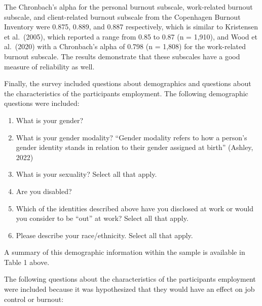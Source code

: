 \documentclass[
  twocolumn]{article}
\providecommand{\tightlist}{%
  \setlength{\itemsep}{0pt}\setlength{\parskip}{0pt}}\usepackage{longtable,booktabs,array}
\begin{document}
The Chronbach's alpha for the personal burnout subscale, work-related
burnout subscale, and client-related burnout subscale from the
Copenhagen Burnout Inventory were 0.875, 0.889, and 0.887 respectively,
which is similar to Kristensen et al.~(2005), which reported a range
from 0.85 to 0.87 (n = 1,910), and Wood et al.~(2020) with a Chronbach's
alpha of 0.798 (n = 1,808) for the work-related burnout subscale. The
results demonstrate that these subscales have a good measure of
reliability as well.

Finally, the survey included questions about demographics and questions
about the characteristics of the participants employment. The following
demographic questions were included:

\begin{enumerate}
\def\labelenumi{\arabic{enumi}.}
\tightlist
\item
  What is your gender?
\item
  What is your gender modality? ``Gender modality refers to how a
  person's gender identity stands in relation to their gender assigned
  at birth'' (Ashley, 2022)
\item
  What is your sexuality? Select all that apply.
\item
  Are you disabled?
\item
  Which of the identities described above have you disclosed at work or
  would you consider to be ``out'' at work? Select all that apply.
\item
  Please describe your race/ethnicity. Select all that apply.
\end{enumerate}

A summary of this demographic information within the sample is available
in Table 1 above.

The following questions about the characteristics of the participants
employment were included because it was hypothesized that they would
have an effect on job control or burnout:
\end{document}
